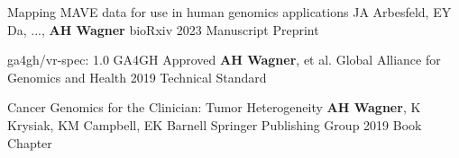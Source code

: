 \otherPub
{Mapping MAVE data for use in human genomics applications}
{JA Arbesfeld, EY Da, ..., \textbf{AH Wagner}}
{bioRxiv}
{2023}
{Manuscript Preprint}

\otherPub
{ga4gh/vr-spec: 1.0 GA4GH Approved}
{\textbf{AH Wagner}, et al.}
{Global Alliance for Genomics and Health}
{2019}
{Technical Standard}

\otherPub
{Cancer Genomics for the Clinician: Tumor Heterogeneity}
{\textbf{AH Wagner}, K Krysiak, KM Campbell, EK Barnell}
{Springer Publishing Group}
{2019}
{Book Chapter}

